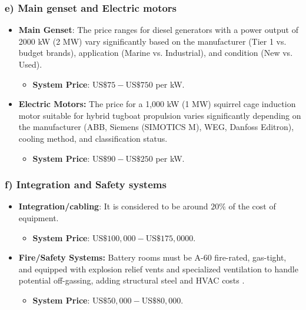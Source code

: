 \subsubsection{e) Main genset and Electric motors}

\begin{itemize}
	\item \textbf{Main Genset}: The price ranges for diesel generators with a power output of 2000 kW (2 MW) vary significantly based on the manufacturer (Tier 1 vs. budget brands), application (Marine vs. Industrial), and condition (New vs. Used).
	\begin{itemize}
		\item \textbf{System Price}: $\text{US}\$75-\text{US}\$750$ per kW.
	\end{itemize}	
	\item \textbf{Electric Motors:} The price for a 1,000 kW (1 MW) squirrel cage induction motor suitable for hybrid tugboat propulsion varies significantly depending on the manufacturer (ABB, Siemens (SIMOTICS M), WEG, Danfoss Editron), cooling method, and classification status. 
	\begin{itemize}
		\item \textbf{System Price}: $\text{US}\$90-\text{US}\$250$ per kW.
	\end{itemize}
\end{itemize}

\subsubsection{f) Integration and Safety systems}

\begin{itemize}
	\item \textbf{Integration/cabling}: It is considered to be around $20\%$ of the cost of equipment.
	\begin{itemize}
		\item \textbf{System Price}: $\text{US}\$100,000-\text{US}\$175,0000$.
	\end{itemize}	
	\item \textbf{Fire/Safety Systems:} Battery rooms must be A-60 fire-rated, gas-tight, and equipped with explosion relief vents and specialized ventilation to handle potential off-gassing, adding structural steel and HVAC costs \cite{Norwegian}. 
	\begin{itemize}
		\item \textbf{System Price}: $\text{US}\$50,000-\text{US}\$80,000$.
	\end{itemize}
\end{itemize}

